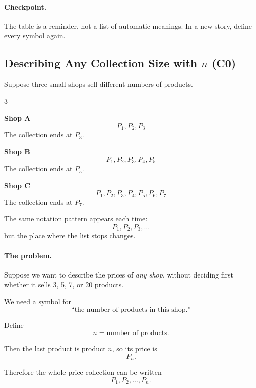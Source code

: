 	\paragraph{Checkpoint.}
	The table is a reminder, not a list of automatic meanings. In a new story, define every symbol again.
	
	
	\subsection{Describing Any Collection Size with $n$ (C0)}
	\label{sec:size-n-c0}
	
	Suppose three small shops sell different numbers of products.
	
	{
		\setlength{\columnseprule}{0.4pt}
		\setlength{\columnsep}{1.5em}
		\begin{multicols}{3}
			
			\textbf{Shop A}
			\[
			P_1,P_2,P_3
			\]
			The collection ends at $P_3$.
			
			\columnbreak
			
			\textbf{Shop B}
			\[
			P_1,P_2,P_3,P_4,P_5
			\]
			The collection ends at $P_5$.
			
			\columnbreak
			
			\textbf{Shop C}
			\[
			P_1,P_2,P_3,P_4,P_5,P_6,P_7
			\]
			The collection ends at $P_7$.
			
		\end{multicols}
	}
	
	The same notation pattern appears each time:
	\[
	P_1,P_2,P_3,\ldots
	\]
	but the place where the list stops changes.
	
	\paragraph{The problem.}
	Suppose we want to describe the prices of \emph{any shop}, without deciding first whether it sells 3, 5, 7, or 20 products.
	
	We need a symbol for
	\[
	\text{``the number of products in this shop.''}
	\]
	
	Define
	\[
	n=\text{number of products}.
	\]
	
	Then the last product is product $n$, so its price is
	\[
	P_n.
	\]
	
	Therefore the whole price collection can be written
	\[
	P_1,P_2,\ldots,P_n.
	\]
	
